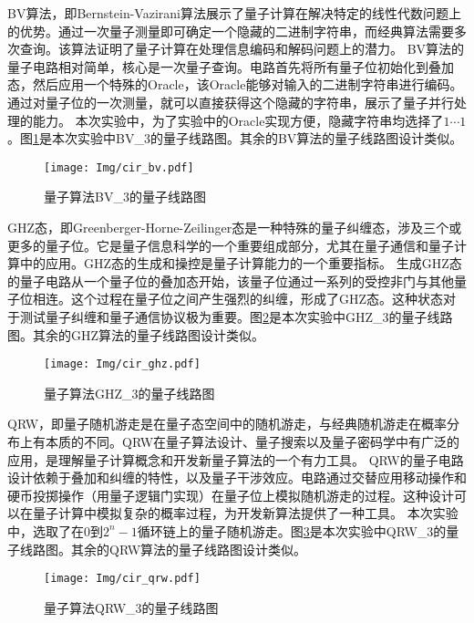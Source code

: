 BV算法，即Bernstein-Vazirani算法展示了量子计算在解决特定的线性代数问题上的优势\citep{nagata2017generalization}。通过一次量子测量即可确定一个隐藏的二进制字符串，而经典算法需要多次查询。该算法证明了量子计算在处理信息编码和解码问题上的潜力。
BV算法的量子电路相对简单，核心是一次量子查询。电路首先将所有量子位初始化到叠加态，然后应用一个特殊的Oracle，该Oracle能够对输入的二进制字符串进行编码。通过对量子位的一次测量，就可以直接获得这个隐藏的字符串，展示了量子并行处理的能力。
本次实验中，为了实验中的Oracle实现方便，隐藏字符串均选择了$1\cdots 1$。图\ref{fig:bv}是本次实验中BV\_3的量子线路图。其余的BV算法的量子线路图设计类似。
\begin{figure}[!htbp]
    \centering
    \texttt{[image: Img/cir\_bv.pdf]}
    \caption{量子算法BV\_3的量子线路图}
    \label{fig:bv}
\end{figure} 

GHZ态，即Greenberger-Horne-Zeilinger态是一种特殊的量子纠缠态，涉及三个或更多的量子位\citep{greenberger1989going}。它是量子信息科学的一个重要组成部分，尤其在量子通信和量子计算中的应用。GHZ态的生成和操控是量子计算能力的一个重要指标。
生成GHZ态的量子电路从一个量子位的叠加态开始，该量子位通过一系列的受控非门与其他量子位相连。这个过程在量子位之间产生强烈的纠缠，形成了GHZ态。这种状态对于测试量子纠缠和量子通信协议极为重要。图\ref{fig:ghz}是本次实验中GHZ\_3的量子线路图。其余的GHZ算法的量子线路图设计类似。
\begin{figure}[!htbp]
    \centering
    \texttt{[image: Img/cir\_ghz.pdf]}
    \caption{量子算法GHZ\_3的量子线路图}
    \label{fig:ghz}
\end{figure} 

QRW，即量子随机游走是在量子态空间中的随机游走，与经典随机游走在概率分布上有本质的不同\citep{kempe2003quantum}。QRW在量子算法设计、量子搜索以及量子密码学中有广泛的应用，是理解量子计算概念和开发新量子算法的一个有力工具。
QRW的量子电路设计依赖于叠加和纠缠的特性，以及量子干涉效应。电路通过交替应用移动操作和硬币投掷操作（用量子逻辑门实现）在量子位上模拟随机游走的过程。这种设计可以在量子计算中模拟复杂的概率过程，为开发新算法提供了一种工具。
本次实验中，选取了在$0$到$2^n-1$循环链上的量子随机游走。图\ref{fig:qrw}是本次实验中QRW\_3的量子线路图。其余的QRW算法的量子线路图设计类似。
\begin{figure}[!htbp]
    \centering
    \texttt{[image: Img/cir\_qrw.pdf]}
    \caption{量子算法QRW\_3的量子线路图}
    \label{fig:qrw}
\end{figure}

